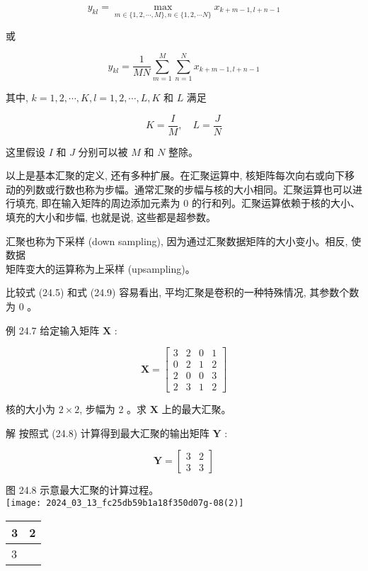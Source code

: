 \documentclass[10pt]{article}
\begin{document}
\begin{equation*}
y_{k l}=\max _{m \in\{1,2, \cdots, M\}, n \in\{1,2, \cdots N\}} x_{k+m-1, l+n-1} \tag{24.8}
\end{equation*}


或


\begin{equation*}
y_{k l}=\frac{1}{M N} \sum_{m=1}^{M} \sum_{n=1}^{N} x_{k+m-1, l+n-1} \tag{24.9}
\end{equation*}


其中, $k=1,2, \cdots, K, l=1,2, \cdots, L, K$ 和 $L$ 满足

$$
K=\frac{I}{M}, \quad L=\frac{J}{N}
$$

这里假设 $I$ 和 $J$ 分别可以被 $M$ 和 $N$ 整除。

以上是基本汇聚的定义, 还有多种扩展。在汇聚运算中, 核矩阵每次向右或向下移动的列数或行数也称为步幅。通常汇聚的步幅与核的大小相同。汇聚运算也可以进行填充, 即在输入矩阵的周边添加元素为 0 的行和列。汇聚运算依赖于核的大小、填充的大小和步幅, 也就是说, 这些都是超参数。

汇聚也称为下采样 (down sampling), 因为通过汇聚数据矩阵的大小变小。相反, 使数据\\
矩阵变大的运算称为上采样 (upsampling)。

比较式 (24.5) 和式 (24.9) 容易看出, 平均汇聚是卷积的一种特殊情况, 其参数个数为 0 。

例 24.7 给定输入矩阵 $\boldsymbol{X}$ :

$$
\boldsymbol{X}=\left[\begin{array}{llll}
3 & 2 & 0 & 1 \\
0 & 2 & 1 & 2 \\
2 & 0 & 0 & 3 \\
2 & 3 & 1 & 2
\end{array}\right]
$$

核的大小为 $2 \times 2$, 步幅为 2 。求 $\boldsymbol{X}$ 上的最大汇聚。

解 按照式 (24.8) 计算得到最大汇聚的输出矩阵 $\boldsymbol{Y}$ :

$$
\boldsymbol{Y}=\left[\begin{array}{ll}
3 & 2 \\
3 & 3
\end{array}\right]
$$

图 24.8 示意最大汇聚的计算过程。\\
\texttt{[image: 2024\_03\_13\_fc25db59b1a18f350d07g-08(2)]}

\begin{center}
\begin{tabular}{|l|l|}
\hline
3 & 2 \\
\hline
3 &  \\
\hline
\end{tabular}
\end{center}
\end{document}
